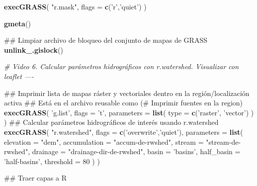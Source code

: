\documentclass[11pt,]{article}
\newenvironment{Shaded}{\begin{snugshade}}{\end{snugshade}}
\newcommand{\KeywordTok}[1]{\textcolor[rgb]{0.13,0.29,0.53}{\textbf{#1}}}
\newcommand{\DataTypeTok}[1]{\textcolor[rgb]{0.13,0.29,0.53}{#1}}
\newcommand{\DecValTok}[1]{\textcolor[rgb]{0.00,0.00,0.81}{#1}}
\newcommand{\StringTok}[1]{\textcolor[rgb]{0.31,0.60,0.02}{#1}}
\newcommand{\CommentTok}[1]{\textcolor[rgb]{0.56,0.35,0.01}{\textit{#1}}}
\newcommand{\NormalTok}[1]{#1}
\begin{document}
\begin{Shaded}
\begin{Highlighting}[]
\KeywordTok{execGRASS}\NormalTok{(}
  \StringTok{"r.mask"}\NormalTok{,}
  \DataTypeTok{flags =} \KeywordTok{c}\NormalTok{(}\StringTok{'r'}\NormalTok{,}\StringTok{'quiet'}\NormalTok{)}
\NormalTok{)}

\KeywordTok{gmeta}\NormalTok{()}

\NormalTok{## Limpiar archivo de bloqueo del conjunto de mapas de GRASS}
\KeywordTok{unlink_.gislock}\NormalTok{()}

\CommentTok{# Video 6. Calcular parámetros hidrográficos con r.watershed. Visualizar con leaflet ----}

\NormalTok{## Imprimir lista de mapas ráster y vectoriales dentro en la región/localización activa }
\NormalTok{## Está en el archivo reusable como (# Imprimir fuentes en la region)}
\KeywordTok{execGRASS}\NormalTok{(}
  \StringTok{'g.list'}\NormalTok{,}
  \DataTypeTok{flags =} \StringTok{'t'}\NormalTok{,}
  \DataTypeTok{parameters =} \KeywordTok{list}\NormalTok{(}
    \DataTypeTok{type =} \KeywordTok{c}\NormalTok{(}\StringTok{'raster'}\NormalTok{, }\StringTok{'vector'}\NormalTok{)}
\NormalTok{  )}
\NormalTok{)}
\NormalTok{## Calcular parámetros hidrográficos de interés usando r.watershed}
\KeywordTok{execGRASS}\NormalTok{(}
  \StringTok{"r.watershed"}\NormalTok{,}
  \DataTypeTok{flags =} \KeywordTok{c}\NormalTok{(}\StringTok{'overwrite'}\NormalTok{,}\StringTok{'quiet'}\NormalTok{),}
  \DataTypeTok{parameters =} \KeywordTok{list}\NormalTok{(}
    \DataTypeTok{elevation =} \StringTok{"dem"}\NormalTok{,}
    \DataTypeTok{accumulation =} \StringTok{"accum-de-rwshed"}\NormalTok{,}
    \DataTypeTok{stream =} \StringTok{"stream-de-rwshed"}\NormalTok{,}
    \DataTypeTok{drainage =} \StringTok{"drainage-dir-de-rwshed"}\NormalTok{,}
    \DataTypeTok{basin =} \StringTok{'basins'}\NormalTok{,}
    \DataTypeTok{half_basin =} \StringTok{'half-basins'}\NormalTok{,}
    \DataTypeTok{threshold =} \DecValTok{80}
\NormalTok{  )}
\NormalTok{)}

\NormalTok{## Traer capas a R}


\end{Highlighting}
\end{Shaded}
\end{document}
